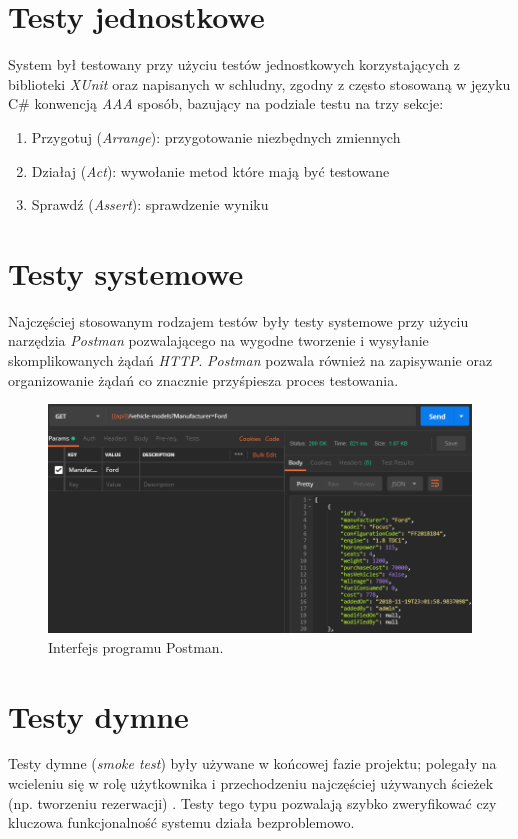 \documentclass[eng,printmode,openany]{mgr}
\begin{document}
	\section{Testy jednostkowe}
	System był testowany przy użyciu testów jednostkowych korzystających z biblioteki \textit{XUnit} oraz napisanych w schludny, zgodny z często stosowaną w języku C\# konwencją \textit{AAA} sposób, bazujący na podziale testu na trzy sekcje:
	\begin{enumerate}
		\item Przygotuj (\textit{Arrange}): przygotowanie niezbędnych zmiennych
		\item Działaj (\textit{Act}): wywołanie metod które mają być testowane 
		\item Sprawdź (\textit{Assert}): sprawdzenie wyniku 
	\end{enumerate}
	
	
	
	\section{Testy systemowe}
	Najczęściej stosowanym rodzajem testów były testy systemowe przy użyciu narzędzia \textit{Postman} pozwalającego na wygodne tworzenie i wysyłanie skomplikowanych żądań \textit{HTTP}. \textit{Postman} pozwala również na zapisywanie oraz organizowanie żądań co znacznie przyśpiesza proces testowania.
	\begin{figure}[H]
		\centering
		\includegraphics[width=\textwidth]{images/tests_postman.png}
		\caption{Interfejs programu Postman.}
	\end{figure}
	\section{Testy dymne}
	Testy dymne (\textit{smoke test}) były używane w końcowej fazie projektu; polegały na wcieleniu się w rolę użytkownika i przechodzeniu najczęściej używanych ścieżek (np. tworzeniu rezerwacji) . Testy tego typu pozwalają szybko zweryfikować czy kluczowa funkcjonalność systemu działa bezproblemowo.
	
\end{document}
